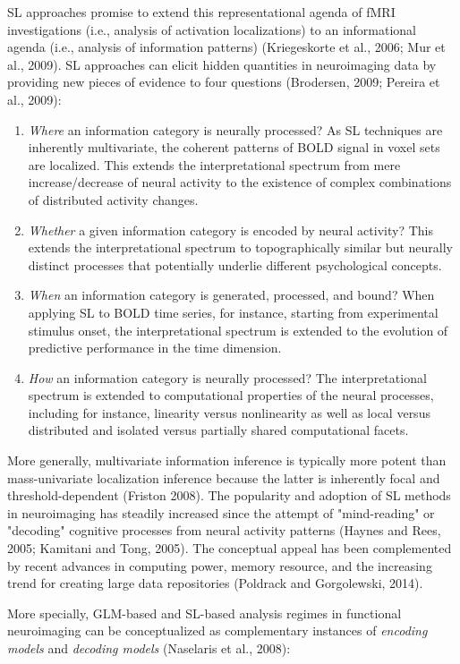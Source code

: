 \documentclass[authoryear,review,3p]{elsarticle}
\begin{document}
SL approaches promise to extend this
representational agenda of fMRI investigations
(i.e., analysis of activation localizations) 
to an informational agenda
(i.e., analysis of information patterns)
(Kriegeskorte et al., 2006; Mur et al., 2009).
%
SL approaches can elicit hidden quantities in neuroimaging data by
providing new pieces of evidence to four questions
(Brodersen, 2009; Pereira et al., 2009):
\begin{enumerate}
  \item\textit{Where} an information category is neurally processed?
  As SL techniques are inherently multivariate, the 
  coherent patterns of BOLD signal in voxel sets are localized.
  This extends the interpretational spectrum from mere
  increase/decrease of neural activity to
  the existence of complex combinations
  of distributed activity changes.
  \item\textit{Whether} a given information category
  is encoded by neural activity? This extends the interpretational
  spectrum to topographically similar but
  neurally distinct processes that potentially underlie
  different psychological concepts.
  \item\textit{When} an information category is generated, processed,
  and bound? When applying SL to BOLD time series, for instance,
  starting from
  experimental stimulus onset, the interpretational
  spectrum is extended to the evolution of predictive performance
  in the time dimension.
  \item\textit{How} an information category is neurally processed?
  The interpretational spectrum is extended to
  computational properties of the neural processes, including
  for instance, linearity versus nonlinearity as well as
  local versus distributed and isolated versus partially
  shared computational facets.
\end{enumerate}
More generally, multivariate information inference is typically
more potent than mass-univariate localization inference
because the latter is inherently focal and threshold-dependent
(Friston 2008).
%
The popularity and adoption of SL methods in neuroimaging
has steadily increased since
the attempt of "mind-reading" or "decoding" cognitive processes
from neural activity patterns
(Haynes and Rees, 2005; Kamitani and Tong, 2005).
The conceptual appeal has been complemented by
recent advances in computing power, memory resource, and
the increasing trend for creating large data repositories
(Poldrack and Gorgolewski, 2014).


More specially, GLM-based and SL-based analysis regimes in 
functional neuroimaging can be conceptualized as
complementary instances of
\textit{encoding models} and \textit{decoding models}
(Naselaris et al., 2008):
\end{document}
